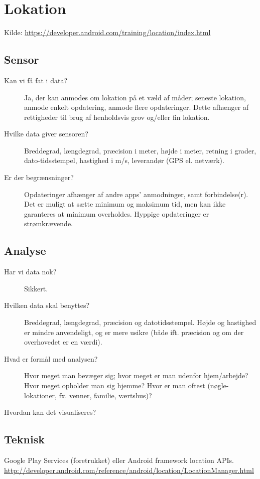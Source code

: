 \section{Lokation}
Kilde: \url{https://developer.android.com/training/location/index.html}

\subsection{Sensor}

\begin{description}
\item[Kan vi få fat i data?]
Ja, der kan anmodes om lokation på et væld af måder; seneste lokation, anmode enkelt opdatering, anmode flere opdateringer.
Dette afhænger af rettigheder til brug af henholdsvis grov og/eller fin lokation.
\item[Hvilke data giver sensoren?]
Breddegrad, længdegrad, præcision i meter, højde i meter, retning i grader, dato-tidsstempel, hastighed i m/s, leverandør (GPS el. netværk).
\item[Er der begrænsninger?]
Opdateringer afhænger af andre apps' anmodninger, samt forbindelse(r).
Det er muligt at sætte minimum og maksimum tid, men kan ikke garanteres at minimum overholdes.
Hyppige opdateringer er strømkrævende.
\end{description}

\subsection{Analyse}
\begin{description}
\item[Har vi data nok?]
Sikkert.
\item[Hvilken data skal benyttes?]
Breddegrad, længdegrad, præcision og datotidsstempel.
Højde og hastighed er mindre anvendeligt, og er mere usikre (både ift. præcision og om der overhovedet er en værdi).
\item[Hvad er formål med analysen?]
Hvor meget man bevæger sig; hvor meget er man udenfor hjem/arbejde? Hvor meget opholder man sig hjemme? Hvor er man oftest (nøgle-lokationer, fx. venner, familie, værtshus)?
\item[Hvordan kan det visualiseres?]

\end{description}

\subsection{Teknisk}
Google Play Services (foretrukket) eller Android framework location APIs.
\url{http://developer.android.com/reference/android/location/LocationManager.html}
